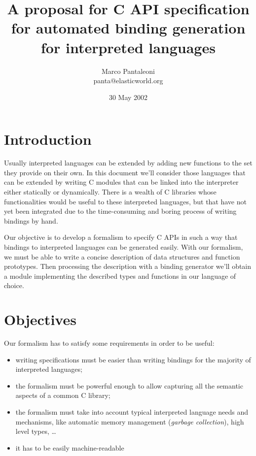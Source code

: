 \documentclass[10pt,twocolumn]{article}
\begin{document}
\title{A proposal for C API specification for automated binding
  generation for interpreted languages}

\author{Marco Pantaleoni\\ {\small panta@elasticworld.org}}

\date{30 May 2002}

\maketitle

\thispagestyle{plain}

\section{Introduction}

Usually interpreted languages can be extended by adding new functions
to the set they provide on their own. In this document we'll consider
those languages that can be extended by writing C modules that can be
linked into the interpreter either statically or dynamically.
There is a wealth of C libraries whose functionalities would be useful
to these interpreted languages, but that have not yet been integrated
due to the time-consuming and boring process of writing bindings by
hand.\par
Our objective is to develop a formalism to specify C APIs in such a
way that bindings to interpreted languages can be generated easily.
With our formalism, we must be able to write a concise description of
data structures and function prototypes. Then processing the
description with a binding generator we'll obtain a module
implementing the described types and functions in our language of
choice.

\section{Objectives}

Our formalism has to satisfy some requirements in order to be useful:

\begin{itemize}
  \item writing specifications must be easier than writing bindings
    for the majority of interpreted languages;

  \item the formalism must be powerful enough to allow capturing all
    the semantic aspects of a common C library;

  \item the formalism must take into account typical interpreted
    language needs and mechanisms, like automatic memory management
    (\textsl{garbage collection}), high level types, \dots

  \item it has to be easily machine-readable
\end{itemize}
\end{document}
